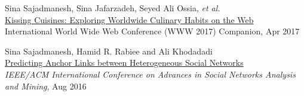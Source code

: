 \documentclass[11pt]{article}
\begin{document}
\begin{enumerate}[label={[\arabic*]}, leftmargin=15pt]
	\item {Sina Sajadmanesh}, Sina Jafarzadeh, Seyed Ali Ossia, \textit{et al.}\\
	\href{https://arxiv.org/pdf/1610.08469}{{Kissing Cuisines: Exploring Worldwide Culinary Habits on the Web}}\\
	International World Wide Web Conference (WWW 2017) Companion, Apr 2017

	\item {Sina Sajadmanesh}, Hamid R. Rabiee and Ali Khodadadi\\
	\href{https://arxiv.org/pdf/1607.08821}{{Predicting Anchor Links between Heterogeneous Social Networks}}\\
	\textit{IEEE/ACM International Conference on Advances in Social Networks Analysis and Mining},  Aug 2016

\end{enumerate}
\end{document}
